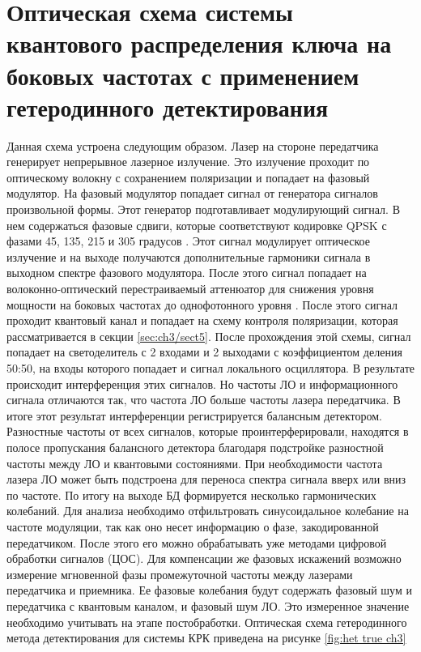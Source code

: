 \section{Оптическая схема системы квантового распределения ключа на боковых частотах с применением гетеродинного детектирования }\label{sec:ch3/sect3}
Данная схема устроена следующим образом. Лазер на стороне передатчика генерирует непрерывное лазерное излучение. Это излучение проходит по оптическому волокну с сохранением поляризации и попадает на фазовый модулятор. На фазовый модулятор попадает сигнал от генератора сигналов произвольной формы. Этот генератор подготавливает модулирующий сигнал. В нем содержаться фазовые сдвиги, которые соответствуют кодировке QPSK с фазами 45, 135, 215 и 305 градусов \cite{karinou2018}. Этот сигнал модулирует оптическое излучение и на выходе получаются дополнительные гармоники сигнала в выходном спектре фазового модулятора. После этого сигнал попадает на волоконно-оптический перестраиваемый аттенюатор для снижения уровня мощности на боковых частотах до однофотонного уровня \cite{oxborrow2005}.
После этого сигнал проходит квантовый канал и попадает на схему контроля поляризации, которая рассматривается в секции \ref{sec:ch3/sect5}. После прохождения этой схемы, сигнал попадает на светоделитель с 2 входами и 2 выходами с коэффициентом деления 50:50, на входы которого попадает и сигнал локального осциллятора. В результате происходит интерференция этих сигналов. Но частоты ЛО и информационного сигнала отличаются так, что частота ЛО больше частоты лазера передатчика. В итоге этот результат интерференции регистрируется балансным детектором. Разностные частоты от всех сигналов, которые проинтерферировали, находятся в полосе пропускания балансного детектора благодаря подстройке разностной частоты между ЛО и квантовыми состояниями. При необходимости частота лазера ЛО может быть подстроена для переноса спектра сигнала вверх или вниз по частоте. По итогу на выходе БД формируется несколько гармонических колебаний. Для анализа необходимо отфильтровать синусоидальное колебание на частоте модуляции, так как оно несет информацию о фазе, закодированной передатчиком. После этого его можно обрабатывать уже методами цифровой обработки сигналов (ЦОС). Для компенсации же фазовых искажений возможно измерение мгновенной фазы промежуточной частоты между лазерами передатчика и приемника. Ее фазовые колебания будут содержать фазовый шум и передатчика с квантовым каналом, и фазовый шум ЛО. Это измеренное значение необходимо учитывать на этапе постобработки. 
Оптическая схема гетеродинного метода детектирования для системы КРК приведена на рисунке \ref*{fig:het true ch3}
